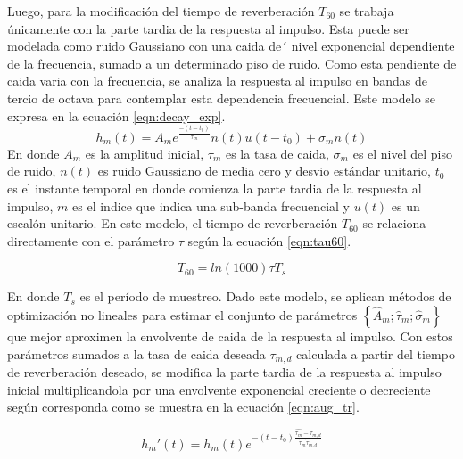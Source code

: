 Luego, para la modificación del tiempo de reverberación $T_{60}$ se trabaja únicamente con la parte tardia de la respuesta al impulso. Esta puede ser modelada como ruido Gaussiano con una caida de´ nivel exponencial dependiente de la frecuencia, sumado a un determinado piso de ruido. Como esta pendiente de caida varia con la frecuencia, se analiza la respuesta al impulso en bandas de tercio de octava para contemplar esta dependencia frecuencial. Este modelo se expresa en la ecuación \ref{eqn:decay_exp}. 
\begin{equation}
\label{eqn:decay_exp}
	h_{m}(t) = A_{m} e^{\frac{-(t-t_{0})}{\tau_{m}}}n(t)u(t-t_{0})+\sigma_{m}n(t)
\end{equation} 
En donde $A_{m}$ es la amplitud inicial, $\tau_{m}$ es la tasa de caida, $\sigma_{m}$ es el nivel del piso de ruido, $n(t)$ es ruido Gaussiano de media cero y desvio estándar unitario, $t_{0}$ es el instante temporal en donde comienza la parte tardia de la respuesta al impulso, $m$ es el indice que indica una sub-banda frecuencial y $u(t)$ es un escalón unitario. En este modelo, el tiempo de reverberación $T_{60}$ se relaciona directamente con el parámetro $\tau$ según la ecuación \ref{eqn:tau60}.

\begin{equation}
\label{eqn:tau60}
	T_{60} = ln(1000)\tau T_{s}
\end{equation}

En donde $T_{s}$ es el período de muestreo. Dado este modelo, se aplican métodos de optimización no lineales para estimar el conjunto de parámetros $\left \{ \hat{A}_{m}; \hat{\tau}_{m}; \hat{\sigma}_{m} \right \}$ que mejor aproximen la envolvente de caida de la respuesta al impulso. Con estos parámetros sumados a la tasa de caida deseada $\tau_{m,d}$ calculada a partir del tiempo de reverberación deseado, se modifica la parte tardia de la respuesta al impulso inicial multiplicandola por una envolvente exponencial creciente o decreciente según corresponda como se muestra en la ecuación  \ref{eqn:aug_tr}.

\begin{equation}
\label{eqn:aug_tr}
	{h_{m}}'(t) = h_{m}(t) e^{-(t-t_{0})\frac{\hat{\tau_{m}}-\tau_{m,d}}{\hat{\tau_{m}}\tau_{m,d}}}
\end{equation}

